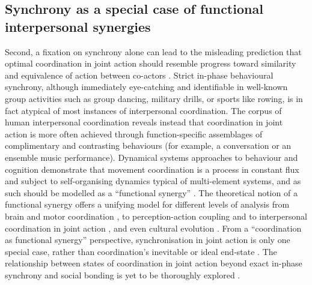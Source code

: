 \begin{CJK}{UTF8}{gbsn}
\subsection{Synchrony as a special case of functional interpersonal synergies}
Second, a fixation on synchrony alone can lead to the misleading prediction that optimal coordination in joint action should resemble progress toward similarity and equivalence of action between co-actors \citep{Fusaroli2014}.  Strict in-phase behavioural synchrony, although immediately eye-catching and identifiable in well-known group activities such as group dancing, military drills, or sports like rowing, is in fact atypical of most instances of interpersonal coordination.  The corpus of human interpersonal coordination reveals instead that coordination in joint action is more often achieved through function-specific assemblages of complimentary and contrasting behaviours (for example, a conversation or an ensemble music performance).  Dynamical systems approaches to behaviour and cognition demonstrate that movement coordination is a process in constant flux and subject to self-organising dynamics typical of multi-element systems, and as such should be modelled as a  ``functional synergy'' \citep{Turvey1977}.  The theoretical notion of a functional synergy offers a unifying model for different levels of analysis from brain \citep{Yufik2013} and motor coordination \citep{Latash2007}, to perception-action coupling \citep{Kelso2009} and to interpersonal coordination in joint action \citep{Riley2011,Schmidt1990}, and even cultural evolution \citep{Claidiere2007a}.  From a ``coordination as functional synergy'' perspective, synchronisation in joint action is only one special case, rather than coordination's inevitable or ideal end-state \citep[128][, Richardson, personal communication]{Kelso2013}.  The relationship between states of coordination in joint action beyond exact in-phase synchrony and social bonding is yet to be thoroughly explored \citep[but for a preliminary outline, see][]{Marsh2009}.










\end{CJK}
